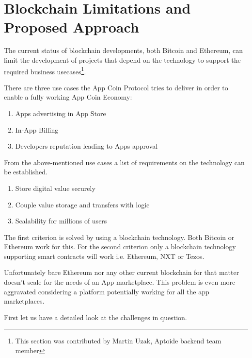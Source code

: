 \section{Blockchain Limitations and Proposed Approach}

\label{sec:limitations}

The current status of blockchain developments, both Bitcoin and Ethereum, can limit the development of projects that depend on the technology to support the required business usecases\footnote{This section was contributed by Martin Uzak, Aptoide backend team member}.

 
There are three use cases the App Coin Protocol tries to deliver in order to enable a fully working App Coin Economy:


\begin{enumerate}
    \item Apps advertising in App Store
    \item In-App Billing 
    \item Developers reputation leading to Apps approval
\end{enumerate}

From the above-mentioned use cases a list of requirements on the technology can be established. 

\begin{enumerate}
    \item Store digital value securely
    \item Couple value storage and transfers with logic
    \item Scalability for millions of users
\end{enumerate}

The first criterion is solved by using a blockchain technology. Both Bitcoin or Ethereum work for this. For the second criterion only a blockchain technology supporting smart contracts will work i.e. Ethereum, NXT or Tezos.

Unfortunately bare Ethereum nor any other current blockchain for that matter doesn't scale for the needs of an App marketplace. This problem is even more aggravated considering a platform potentially working for all the app marketplaces.

First let us have a detailed look at the challenges in question.

